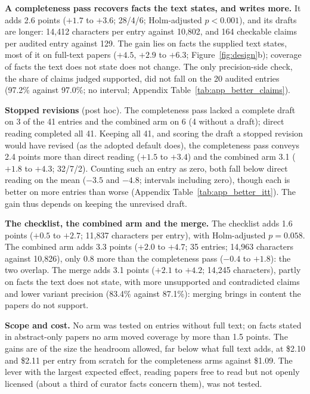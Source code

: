 \documentclass{article} %
\begin{document}
\textbf{A completeness pass recovers facts the text states, and writes more.} It adds 2.6 points ($+1.7$ to $+3.6$; 28/4/6; Holm-adjusted $p<0.001$), and its drafts are longer: 14,412 characters per entry against 10,802, and 164 checkable claims per audited entry against 129. The gain lies on facts the supplied text states, most of it on full-text papers ($+4.5$, $+2.9$ to $+6.3$; Figure~\ref{fig:design}b); coverage of facts the text does not state does not change. The only precision-side check, the share of claims judged supported, did not fall on the 20 audited entries (97.2\% against 97.0\%; no interval; Appendix Table~\ref{tab:app_better_claims}).

\textbf{Stopped revisions} (post hoc). The completeness pass lacked a complete draft on 3 of the 41 entries and the combined arm on 6 (4 without a draft); direct reading completed all 41. Keeping all 41, and scoring the draft a stopped revision would have revised (as the adopted default does), the completeness pass conveys 2.4 points more than direct reading ($+1.5$ to $+3.4$) and the combined arm 3.1 ($+1.8$ to $+4.3$; 32/7/2). Counting such an entry as zero, both fall below direct reading on the mean ($-3.5$ and $-4.8$; intervals including zero), though each is better on more entries than worse (Appendix Table~\ref{tab:app_better_itt}). The gain thus depends on keeping the unrevised draft.

\textbf{The checklist, the combined arm and the merge.} The checklist adds 1.6 points ($+0.5$ to $+2.7$; 11,837 characters per entry), with Holm-adjusted $p=0.058$. The combined arm adds 3.3 points ($+2.0$ to $+4.7$; 35 entries; 14,963 characters against 10,826), only 0.8 more than the completeness pass ($-0.4$ to $+1.8$): the two overlap. The merge adds 3.1 points ($+2.1$ to $+4.2$; 14,245 characters), partly on facts the text does not state, with more unsupported and contradicted claims and lower variant precision (83.4\% against 87.1\%): merging brings in content the papers do not support.

\textbf{Scope and cost.} No arm was tested on entries without full text; on facts stated in abstract-only papers no arm moved coverage by more than 1.5 points. The gains are of the size the headroom allowed, far below what full text adds, at \$2.10 and \$2.11 per entry from scratch for the completeness arms against \$1.09. The lever with the largest expected effect, reading papers free to read but not openly licensed (about a third of curator facts concern them), was not tested.
\end{document}
